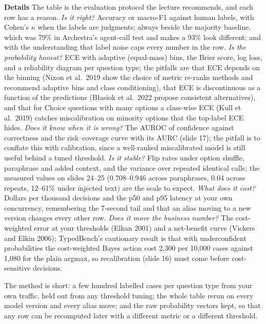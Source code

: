 \documentclass[11pt,letterpaper]{article}
\newcommand{\para}[1]{\medskip\noindent\textbf{#1}\quad}
\begin{document}
\para{Details} The table is the evaluation protocol the lecture recommends, and each row has a reason. \emph{Is it right?} Accuracy or macro-F1 against human labels, with Cohen's $\kappa$ when the labels are judgments; always beside the majority baseline, which was 79\% in Archestra's agent-call test and makes a 93\% look different; and with the understanding that label noise caps every number in the row. \emph{Is the probability honest?} ECE with adaptive (equal-mass) bins, the Brier score, log loss, and a reliability diagram per question type; the pitfalls are that ECE depends on the binning (Nixon et al.\ 2019 show the choice of metric re-ranks methods and recommend adaptive bins and class conditioning), that ECE is discontinuous as a function of the predictions (B\l{}asiok et al.\ 2022 propose consistent alternatives), and that for Choice questions with many options a class-wise ECE (Kull et al.\ 2019) catches miscalibration on minority options that the top-label ECE hides. \emph{Does it know when it is wrong?} The AUROC of confidence against correctness and the risk--coverage curve with its AURC (slide 17); the pitfall is to conflate this with calibration, since a well-ranked miscalibrated model is still useful behind a tuned threshold. \emph{Is it stable?} Flip rates under option shuffle, paraphrase and added context, and the variance over repeated identical calls; the measured values on slides 24--25 (0.708--0.946 across paraphrases, 0.04 across repeats, 12--61\% under injected text) are the scale to expect. \emph{What does it cost?} Dollars per thousand decisions and the p50 and p95 latency at your own concurrency, remembering the 7-second tail and that an alias moving to a new version changes every other row. \emph{Does it move the business number?} The cost-weighted error at your thresholds (Elkan 2001) and a net-benefit curve (Vickers and Elkin 2006); TypedBench's cautionary result is that with underconfident probabilities the cost-weighted Bayes action cost 2,300 per 10,000 cases against 1,080 for the plain argmax, so recalibration (slide 16) must come before cost-sensitive decisions.

The method is short: a few hundred labelled cases per question type from your own traffic, held out from any threshold tuning; the whole table rerun on every model version and every alias move; and the raw probability vectors kept, so that any row can be recomputed later with a different metric or a different threshold.
\end{document}
